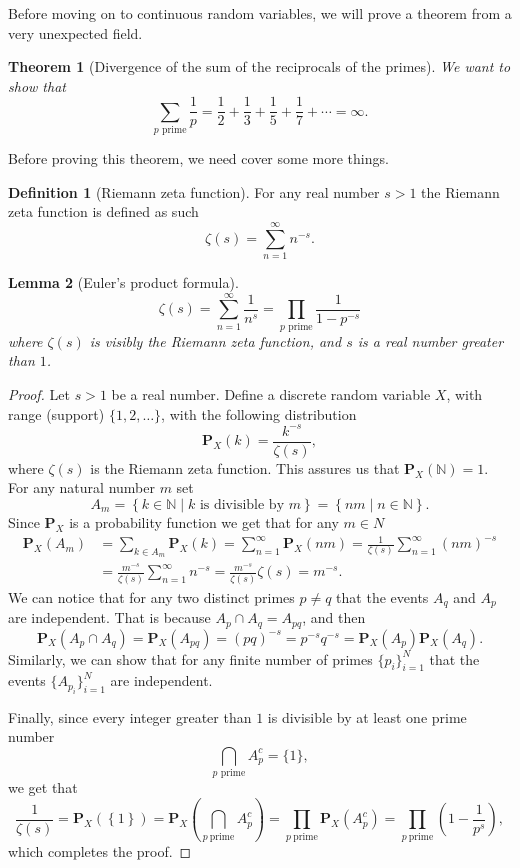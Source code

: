 \documentclass[11pt,a4paper]{article}
\theoremstyle{definition}
\newtheorem{definition}{Definition}[section]
\theoremstyle{plain}
\newtheorem{theorem}{Theorem}[section]
\newtheorem{lemma}[theorem]{Lemma}
\newcommand{\N}{\mathbb{N}}
\newcommand{\set}[2]{ \left\{ #1 \mid #2 \right\} }
\begin{document}
  Before moving on to continuous random variables, we will prove a theorem
  from a very unexpected field.
  \begin{theorem}[Divergence of the sum of the reciprocals of the primes]
    \label{thm:drp}
    We want to show that
    \[
      \sum _{p{\text{ prime}}}{\frac {1}{p}} =
      {\frac {1}{2}}+
      {\frac {1}{3}}+
      {\frac {1}{5}}+
      {\frac {1}{7}}+
      \cdots = \infty.
    \]
  \end{theorem}
  Before proving this theorem, we need cover some more things.
  \begin{definition}[Riemann zeta function]
    For any real number $s > 1$ the Riemann zeta function is defined
    as such
    \[
      \zeta(s) = \sum_{n=1}^{\infty} n^{-s}.
    \]
  \end{definition}
  \begin{lemma}[Euler's product formula]\label{lem:epf}
    \[
      \zeta (s) =
      \sum _{n=1}^{\infty }{\frac {1}{n^{s}}} =
      \prod _{p{\text{ prime}}}{\frac {1}{1-p^{-s}}}
    \]
    where $\zeta(s)$ is visibly the Riemann zeta function, and $s$
    is a real number greater than $1$.
  \end{lemma}
  \begin{proof}
    Let $s > 1$ be a real number. Define a discrete random variable $X$,
    with range (support) $\{1,2,\dots\}$, with the following distribution
    \[
      \mathbf P_X(k) = \frac{k^{-s}}{\zeta(s)},
    \]
  where $\zeta(s)$ is the Riemann zeta function.
  This assures us that $\mathbf P_X(\N) = 1$. 
  For any natural number $m$ set
  \[
    A_m = 
    \set{k \in \N}{\text{$k$ is divisible by $m$}} =
    \set{nm}{n \in \N}.
  \]
  Since $\mathbf P_X$ is a probability function we get that for any $m \in N$
  \begin{align*}
    \mathbf{P}_{X}\left(A_{m}\right) 
    &= \sum_{k \in A_{m}} \mathbf{P}_{X}\left(k\right)
    = \sum_{n=1}^{\infty} \mathbf{P}_{X}\left(n m\right)
    = {\frac{1}{\zeta(s)}} \sum_{n=1}^{\infty} \left(n m\right)^{-s} \\
    &= {\frac{m^{-s}}{\zeta(s)}} \sum_{n=1}^{\infty} n^{-s}
    = {\frac{m^{-s}}{\zeta(s)}} \zeta(s)
    = m^{-s}.
  \end{align*}
  We can notice that for any two distinct primes $p \neq q$ that the events
  $A_q$ and $A_p$ are independent. That is because $A_p \cap A_q = A_{pq}$,
  and then
  \[
    \mathbf P_X(A_p \cap A_q) =
    \mathbf P_X(A_{pq}) =
    (pq)^{-s} =
    p^{-s} q^{-s} =
    \mathbf P_X(A_p) \mathbf P_X(A_q).
  \]
  Similarly, we can show that for any finite number of primes 
  $\{p_i\}_{i=1}^{N}$ that the events $\{A_{p_i}\}_{i=1}^{N}$ are independent.

  Finally, since every integer greater than $1$ is divisible by at least
  one prime number
  \[
    \bigcap_{p\text{ prime}} A_p^c = \{1\},
  \]
  we get that
  \[
    {\frac{1}{\zeta(s)}} = 
    \mathbf{P}_{X}\left(\left\{1\right\}\right) = 
    \mathbf{P}_{X}\left(\bigcap_{p \ \mathrm{prime}} A_{p}^{c}\right) = 
    \prod_{p \ \mathrm{prime}} \mathbf{P}_{X}\left(A_{p}^{c}\right) = 
    \prod_{p \ \mathrm{prime}} \left(1 - \frac{1}{p^{s}}\right),
  \]
  which completes the proof.
  \end{proof}
\end{document}

